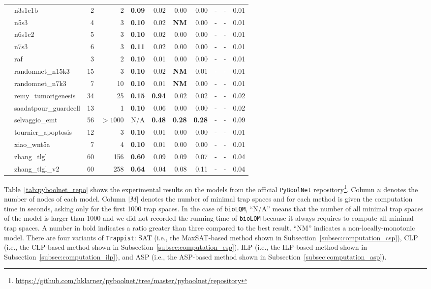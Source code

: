 \documentclass[preprint,12pt]{elsarticle}
\newcounter{rownumber}
\newcommand\rownb{\stepcounter{rownumber}\arabic{rownumber}}
\begin{document}
\begin{table}[!htb]
{\begin{tabular}{rlrrrrrrrrr}
    \rownb & n3s1c1b & 2 & 2 & \textbf{0.09} & 0.02 & 0.00 & 0.00 & - & - & 0.01\\
    \rownb & n5s3 & 4 & 3 & \textbf{0.10} & 0.02 & \textbf{NM} & 0.00 & - & - & 0.01\\
    \rownb & n6s1c2 & 5 & 3 & \textbf{0.10} & 0.02 & 0.00 & 0.00 & - & - & 0.01\\
    \rownb & n7s3 & 6 & 3 & \textbf{0.11} & 0.02 & 0.00 & 0.00 & - & - & 0.01\\
    \rownb & raf & 3 & 2 & \textbf{0.10} & 0.01 & 0.00 & 0.00 & - & - & 0.01\\
    \rownb & randomnet\_n15k3 & 15 & 3 & \textbf{0.10} & 0.02 & \textbf{NM} & 0.01 & - & - & 0.01\\
    \rownb & randomnet\_n7k3 & 7 & 10 & \textbf{0.10} & 0.01 & \textbf{NM} & 0.00 & - & - & 0.01\\
    \rownb & remy\_tumorigenesis & 34 & 25 & \textbf{0.15} & \textbf{0.94} & 0.02 & 0.02 & - & - & 0.02\\
    \rownb & saadatpour\_guardcell & 13 & 1 & \textbf{0.10} & 0.06 & 0.00 & 0.00 & - & - & 0.02\\
    \rownb & selvaggio\_emt & 56 & $>1000$ & N/A & \textbf{0.48} & \textbf{0.28} & \textbf{0.28} & - & - & 0.09\\
    \rownb & tournier\_apoptosis & 12 & 3 & \textbf{0.10} & 0.01 & 0.00 & 0.00 & - & - & 0.01\\
    \rownb & xiao\_wnt5a & 7 & 4 & \textbf{0.10} & 0.01 & 0.00 & 0.00 & - & - & 0.01\\
    \rownb & zhang\_tlgl & 60 & 156 & \textbf{0.60} & 0.09 & 0.09 & 0.07 & - & - & 0.04\\
    \rownb & zhang\_tlgl\_v2 & 60 & 258 & \textbf{0.64} & 0.04 & 0.08 & 0.11 & - & - & 0.04\\
    \bottomrule
  \end{tabular}
  }
\end{table}
\setcounter{rownumber}{0}

Table~\ref{tab:pyboolnet_repo} shows the experimental results on the models from the official \texttt{PyBoolNet} repository\footnote{\url{https://github.com/hklarner/pyboolnet/tree/master/pyboolnet/repository}}.
Column \(n\) denotes the number of nodes of each model. 
Column \(|M|\) denotes the number of minimal trap spaces and for each method is given the computation time in seconds, asking only for the first 1000 trap spaces.
In the case of \texttt{bioLQM}, ``N/A'' means that the number of all minimal trap spaces of the model is larger than 1000 and we did not recorded the running time of \texttt{bioLQM} because it always requires to compute all minimal trap spaces.
A number in bold indicates a ratio greater than three compared to the best result. 
``NM'' indicates a non-locally-monotonic model.
There are four variants of \texttt{Trappist}: SAT (i.e., the MaxSAT-based method shown in Subsection~\ref{subsec:computation_csp}), CLP (i.e., the CLP-based method shown in Subsection~\ref{subsec:computation_csp}), ILP (i.e., the ILP-based method shown in Subsection~\ref{subsec:computation_ilp}), and ASP (i.e., the ASP-based method shown in Subsection~\ref{subsec:computation_asp}).
    
\end{document}
